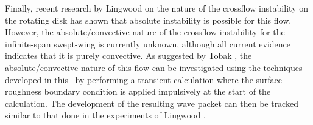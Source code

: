 Finally, recent research by Lingwood \cite{Lingwood:95,Lingwood:96} on the
nature of the crossflow instability on the rotating disk has shown that
absolute instability is possible for this flow.  However, the
absolute/convective nature of the crossflow instability for the infinite-span
swept-wing is currently unknown, although all current evidence indicates that
it is purely convective.  As suggested by Tobak \cite{Tobak:96}, the
absolute/convective nature of this flow can be investigated using the
techniques developed in this \thesis\ by performing a transient calculation
where the surface roughness boundary condition is applied impulsively at the
start of the calculation.  The development of the resulting wave packet can
then be tracked similar to that done in the experiments of Lingwood
\cite{Lingwood:96}.
